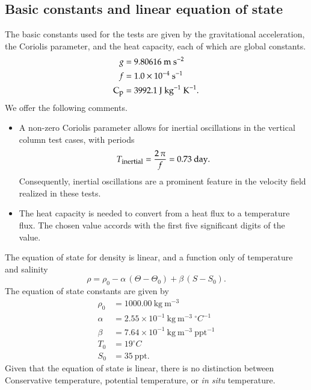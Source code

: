 \subsection{Basic constants and linear equation of state}
\label{subsection:equation-of-state}

The basic constants used for the tests are given by the gravitational
acceleration, the Coriolis parameter, and the heat capacity, each of
which are global constants.
\begin{subequations}
\begin{align}
 g &= 9.80616~\mbox{m}~\mbox{s}^{-2}
 \\
 f &= 1.0 \times 10^{-4}~\mbox{s}^{-1}
 \\
\mbox{C}_{\mbox{\footnotesize p}} &= 3992.1~\mbox{J}~\mbox{kg}^{-1}~\mbox{K}^{-1}. 
\end{align}
\end{subequations}
We offer the following comments.
\begin{itemize}
\item A non-zero Coriolis parameter allows for inertial oscillations
  in the vertical column test cases, with periods 
\begin{equation}
   T_{\mbox{\footnotesize inertial}} = \frac{2 \, \pi}{f} = 0.73~\mbox{day}.
\label{eq:inertial-period}
\end{equation}
Consequently, inertial oscillations are a prominent feature in the
velocity field realized in these tests.

\item The heat capacity is needed to convert from a heat flux to a
  temperature flux.  The chosen value accords with the first five
  significant digits of the \cite{TEOS2010} value.

\end{itemize}
The equation of state for density is linear, and a function only of
temperature and salinity 
\begin{equation}
\rho = \rho_0 - \alpha \, (\Theta - \Theta_0) + \beta \, (S-S_0).
\label{eq:linear-eos}
\end{equation}
The equation of state constants are given by 
\begin{subequations}
\begin{align}
 \rho_0 &= 1000.00~\mbox{kg}~\mbox{m}^{-3}
\label{eq:linear-eos-paramA}
 \\
\alpha &= 2.55 \times 10^{-1}~\mbox{kg}~\mbox{m}^{-3}~^{\circ}C^{-1}
\\
\beta &= 7.64\times10^{-1}~\mbox{kg}~\mbox{m}^{-3}~\mbox{ppt}^{-1}
 \\
T_0  &=  19^{\circ}C 
\\
S_0 &=  35~\mbox{ppt}.
\label{eq:linear-eos-paramB}
\end{align}
\end{subequations}
  Given that the equation of state is linear, there is no distinction
  between Conservative temperature, potential temperature, or {\it in
    situ} temperature.  



